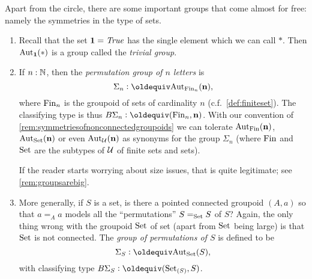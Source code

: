 \begin{example}\label{ex:groups}
  Apart from the circle, there are some important groups that come almost for free: namely the symmetries in the type of sets.
  \begin{enumerate}
  \item Recall that the set $\mathbf{1} =\mathop{\mathit{True}}$ has the single element which we can call $*$. Then $\mathrm{Aut}_{\mathbf{1} }(*)$ is a group called the \emph{trivial group}.
  \item If $n:\mathbb{N}$, then the \emph{permutation group of $n$ letters} is 
$$\Sigma_n\defequi\aut_{\fin_n}(\bn{n} ),$$ 
where $\operatorname{Fin}_n$ is the groupoid of sets of cardinality $n$ (c.f.~\ref{def:finiteset}).  
The classifying type is thus $B\Sigma_n\defequi (\fin_n,\bn{n})$.
With our convention of \cref{rem:symmetriesofnonconnectedgroupoids} we can tolerate $\mathrm{Aut}_{\operatorname{Fin}}(\mathbf{n})$, $\mathrm{Aut}_{\mathord{\mathrm{Set}}}(\mathbf{n})$ or even $\mathrm{Aut}_{\mathcal{U}}(\mathbf{n})$ as synonyms for the group $\Sigma_n$ (where $\operatorname{Fin}$ and $\mathord{\mathrm{Set}}$ are the subtypes of $\mathcal{U}$ of finite sets and sets).  

If the reader starts worrying about size issues, that is quite legitimate; see \cref{rem:groupsarebig}.
  \item More generally, if $S$ is a set, is there a pointed connected groupoid $(A,a)$ so that $a=_Aa$ models all the ``permutations'' $S=_{\mathord{\mathrm{Set}}}S$ of $S$?  Again, the only thing wrong with the groupoid $\mathord{\mathrm{Set}}$ of set (apart from $\mathord{\mathrm{Set}}$ being large) is that $\mathord{\mathrm{Set}}$ is not connected. 
%
 The \emph{group of permutations of $S$} is defined to be 
$$\Sigma_{S}\defequi\aut_{\Set}(S),$$  
with classifying type $B\Sigma_S\defequi(\Set_{(S)},S)$.
  \end{enumerate}
\end{example}

